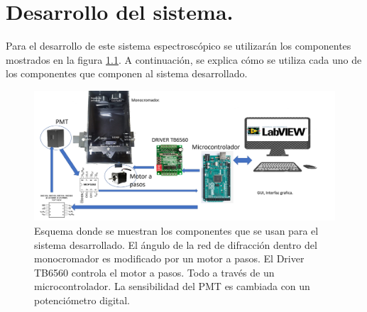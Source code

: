 \chapter{Desarrollo del sistema.}
Para el desarrollo de este sistema espectroscópico se utilizarán los componentes mostrados en la figura \ref{fig:esquema}. A continuación, se explica cómo se utiliza cada uno de los componentes que componen al sistema desarrollado.

\begin{figure}[h]
	\centering
	\includegraphics[width=0.98\linewidth]{Imagenes/3/esquema}
	\caption[Esquema donde se muestran los componentes que se usarán para el sistema desarrollado.]{Esquema donde se muestran los componentes que se usan para el sistema desarrollado. El ángulo de la red de difracción dentro del monocromador es modificado por un motor a pasos. El Driver TB6560 controla el motor a pasos. Todo a través de un microcontrolador. La sensibilidad del PMT es cambiada con un potenciómetro digital.}
	\label{fig:esquema}
\end{figure}

